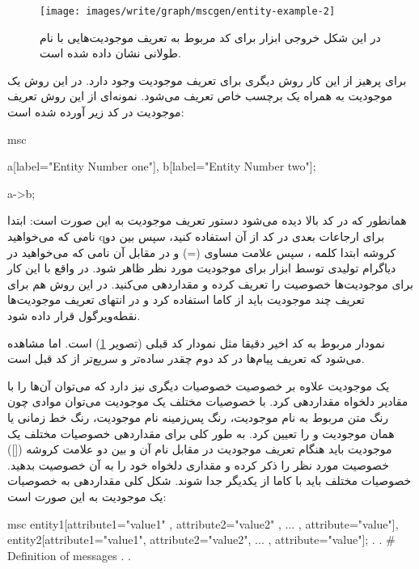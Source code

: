 \begin{figure}[h]
	\centering
	\texttt{[image: images/write/graph/mscgen/entity-example-2]}
	\caption[مثالی از نحوه تعریف موجودیت‌هایی با نام‌های طولانی و حاوی خط فاصله]
	{در این شکل خروجی ابزار  برای کد مربوط به تعریف موجودیت‌هایی با نام طولانی نشان داده شده است.}
	\label{images/write/graph/mscgen/entity-example-2}
\end{figure}

برای پرهیز از این کار روش دیگری برای تعریف موجودیت وجود دارد. در این روش یک
موجودیت به همراه یک برچسب خاص تعریف می‌شود. نمونه‌ای از این روش تعریف موجودیت در
کد زیر آورده شده است:

\begin{MSC}
msc {
	a[label="Entity Number one"], b[label="Entity Number two"];
	
	a->b;
}
\end{MSC}

همانطور که در کد بالا دیده می‌شود دستور تعریف موجودیت به این صورت است: ابتدا
نامی که می‌خواهید qبرای ارجاعات بعدی در کد از آن استفاده کنید، سپس بین دو کروشه
ابتدا کلمه ، سپس علامت مساوی (=) و در مقابل آن نامی که می‌خواهید در
دیاگرام تولیدی توسط ابزار  برای موجودیت مورد نظر ظاهر شود. در واقع با
این کار برای موجودیت‌ها خصوصیت  را تعریف کرده و مقداردهی می‌کنید. در این
روش هم برای تعریف چند موجودیت باید از کاما استفاده کرد و در انتهای تعریف
موجودیت‌ها نقطه‌ویرگول قرار داده شود.

نمودار مربوط به کد اخیر دقیقا مثل نمودار کد قبلی (تصویر
\ref{images/write/graph/mscgen/entity-example-2}) است. اما مشاهده می‌شود که
تعریف پیام‌ها در کد دوم چقدر ساده‌تر و سریع‌تر از کد قبل است.

یک موجودیت علاوه بر خصوصیت  خصوصیات دیگری نیز دارد که می‌توان آن‌ها را با
مقادیر دلخواه مقداردهی کرد. با خصوصیات مختلف یک موجودیت می‌توان موادی چون رنگ متن
مربوط به نام موجودیت، رنگ پس‌زمینه نام موجودیت، رنگ خط زمانی یا همان
 موجودیت و \lr{\ldots} را تعیین کرد. به طور کلی برای مقداردهی
خصوصیات مختلف یک موجودیت باید هنگام تعریف موجودیت در مقابل نام آن و بین دو علامت کروشه
([]) خصوصیت مورد نظر را ذکر کرده و مقداری دلخواه خود را به آن خصوصیت بدهید. خصوصیات مختلف
باید با کاما از یکدیگر جدا شوند. شکل کلی مقداردهی به خصوصیات یک موجودیت به این صورت
است:

\begin{MSC}
msc {
	entity1[attribute1="value1" , attribute2="value2" , ... ,
	attribute="value"],
	entity2[attribute1="value1", attribute2="value2", ... ,
	attribute="value"];
	.
	.
	# Definition of messages
	.
	.
}
\end{MSC}

